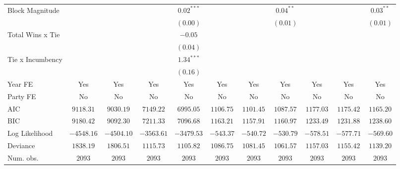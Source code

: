 \begin{table}
\begin{center}
\begin{tabular}{l c c c c c c c c c c}
Block Magnitude  &               &               &               & $0.02^{***}$  &              &              & $0.04^{**}$  &              &              & $0.03^{**}$ \\
                 &               &               &               & $(0.00)$      &              &              & $(0.01)$     &              &              & $(0.01)$    \\
Total Wins x Tie &               &               &               & $-0.05$       &              &              &              &              &              &             \\
                 &               &               &               & $(0.04)$      &              &              &              &              &              &             \\
Tie x Incumbency &               &               &               & $1.34^{***}$  &              &              &              &              &              &             \\
                 &               &               &               & $(0.16)$      &              &              &              &              &              &             \\
\hline
Year FE          & Yes           & Yes           & Yes           & Yes           & Yes          & Yes          & Yes          & Yes          & Yes          & Yes         \\
Party FE         & No            & No            & No            & No            & No           & No           & No           & No           & No           & No          \\
AIC              & $9118.31$     & $9030.19$     & $7149.22$     & $6995.05$     & $1106.75$    & $1101.45$    & $1087.57$    & $1177.03$    & $1175.42$    & $1165.20$   \\
BIC              & $9180.42$     & $9092.30$     & $7211.33$     & $7096.68$     & $1163.21$    & $1157.91$    & $1160.97$    & $1233.49$    & $1231.88$    & $1238.60$   \\
Log Likelihood   & $-4548.16$    & $-4504.10$    & $-3563.61$    & $-3479.53$    & $-543.37$    & $-540.72$    & $-530.79$    & $-578.51$    & $-577.71$    & $-569.60$   \\
Deviance         & $1838.19$     & $1806.51$     & $1115.73$     & $1105.82$     & $1086.75$    & $1081.45$    & $1061.57$    & $1157.03$    & $1155.42$    & $1139.20$   \\
Num. obs.        & $2093$        & $2093$        & $2093$        & $2093$        & $2093$       & $2093$       & $2093$       & $2093$       & $2093$       & $2093$      \\

\end{tabular}
\end{center}
\end{table}
